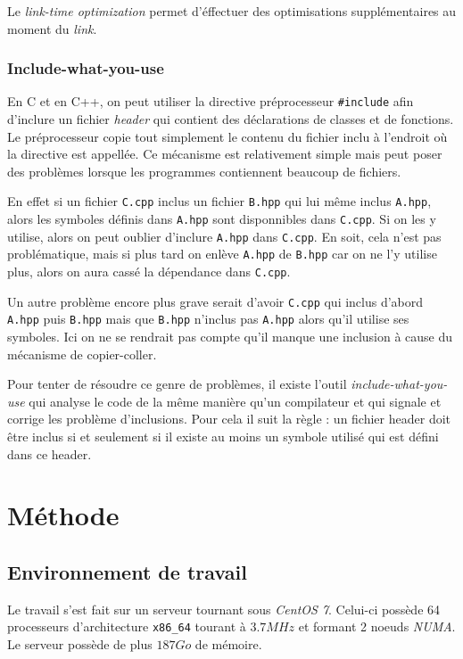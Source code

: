 \documentclass[a4paper]{report}
\begin{document}
Le \emph{link-time optimization} permet d'éffectuer des optimisations supplémentaires au moment du \emph{link}.

\subsection{Include-what-you-use}
En C et en C++, on peut utiliser la directive préprocesseur \verb'#include' afin d'inclure un fichier \emph{header} qui contient des déclarations de classes et de fonctions.
Le préprocesseur copie tout simplement le contenu du fichier inclu à l'endroit où la directive est appellée.
Ce mécanisme est relativement simple mais peut poser des problèmes lorsque les programmes contiennent beaucoup de fichiers.

En effet si un fichier \verb'C.cpp' inclus un fichier \verb'B.hpp' qui lui même inclus \verb'A.hpp', alors les symboles définis dans \verb'A.hpp' sont disponnibles dans \verb'C.cpp'.
Si on les y utilise, alors on peut oublier d'inclure \verb'A.hpp' dans \verb'C.cpp'.
En soit, cela n'est pas problématique, mais si plus tard on enlève \verb'A.hpp' de \verb'B.hpp' car on ne l'y utilise plus, alors on aura cassé la dépendance dans \verb'C.cpp'.

Un autre problème encore plus grave serait d'avoir \verb'C.cpp' qui inclus d'abord \verb'A.hpp' puis \verb'B.hpp' mais que \verb'B.hpp' n'inclus pas \verb'A.hpp' alors qu'il utilise ses symboles.
Ici on ne se rendrait pas compte qu'il manque une inclusion à cause du mécanisme de copier-coller.

Pour tenter de résoudre ce genre de problèmes, il existe l'outil \emph{include-what-you-use} qui analyse le code de la même manière qu'un compilateur et qui signale et corrige les problème d'inclusions.
Pour cela il suit la règle : un fichier header doit être inclus si et seulement si il existe au moins un symbole utilisé qui est défini dans ce header.

\chapter{Méthode}
\section{Environnement de travail}
Le travail s'est fait sur un serveur tournant sous \emph{CentOS 7}.
Celui-ci possède 64 processeurs d'architecture \verb'x86_64' tourant à $3.7 MHz$ et formant 2 noeuds \emph{NUMA}.
Le serveur possède de plus $187 Go$ de mémoire.
\end{document}
